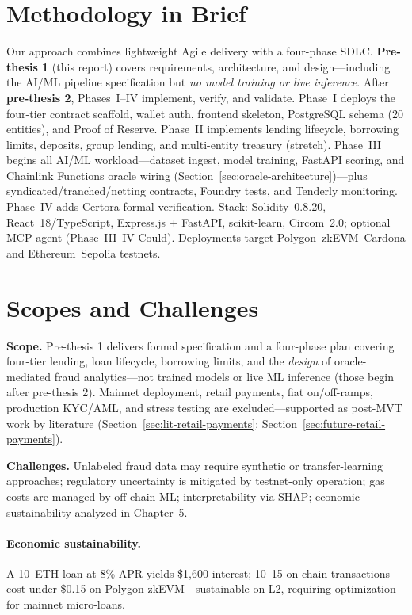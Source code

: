 \documentclass[12pt, a4paper]{report}
\begin{document}
\section{Methodology in Brief}

Our approach combines lightweight Agile delivery with a four-phase SDLC. \textbf{Pre-thesis 1} (this report) covers requirements, architecture, and design---including the AI/ML pipeline specification but \textit{no model training or live inference}. After \textbf{pre-thesis 2}, Phases~I--IV implement, verify, and validate. Phase~I deploys the four-tier contract scaffold, wallet auth, frontend skeleton, PostgreSQL schema (20 entities), and Proof of Reserve. Phase~II implements lending lifecycle, borrowing limits, deposits, group lending, and multi-entity treasury (stretch). Phase~III begins all AI/ML workload---dataset ingest, model training, FastAPI scoring, and Chainlink Functions oracle wiring (Section~\ref{sec:oracle-architecture})---plus syndicated/tranched/netting contracts, Foundry tests, and Tenderly monitoring. Phase~IV adds Certora formal verification. Stack: Solidity~0.8.20, React~18/TypeScript, Express.js + FastAPI, scikit-learn, Circom~2.0; optional MCP agent (Phase~III--IV Could). Deployments target Polygon~zkEVM~Cardona and Ethereum~Sepolia testnets.

\section{Scopes and Challenges}
\label{sec:scopes-challenges}

\textbf{Scope.} Pre-thesis 1 delivers formal specification and a four-phase plan covering four-tier lending, loan lifecycle, borrowing limits, and the \textit{design} of oracle-mediated fraud analytics---not trained models or live ML inference (those begin after pre-thesis 2). Mainnet deployment, retail payments, fiat on/off-ramps, production KYC/AML, and stress testing are excluded---supported as post-MVT work by literature (Section~\ref{sec:lit-retail-payments}; Section~\ref{sec:future-retail-payments}).

\textbf{Challenges.} Unlabeled fraud data may require synthetic or transfer-learning approaches; regulatory uncertainty is mitigated by testnet-only operation; gas costs are managed by off-chain ML; interpretability via SHAP; economic sustainability analyzed in Chapter~5.

\paragraph{Economic sustainability.} A 10~ETH loan at 8\% APR yields \$1,600 interest; 10--15 on-chain transactions cost under \$0.15 on Polygon zkEVM---sustainable on L2, requiring optimization for mainnet micro-loans.
\end{document}
